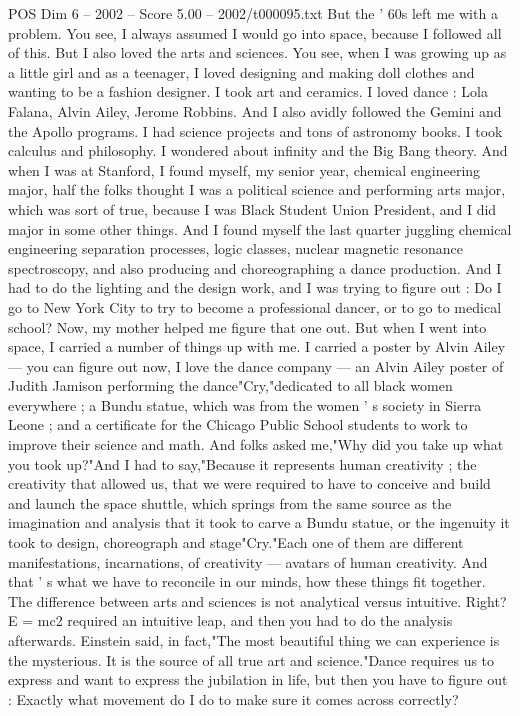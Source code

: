 \begin{textsample}{POS Dim 6 – 2002 – Score 5.00 – 2002/t000095.txt}
But the ' 60s left me with a problem.
You see, I always assumed I would go into space, because I followed all of this.
But I also loved the arts and sciences.
You see, when I was growing up as a little girl and as a teenager, I loved designing and making doll clothes and wanting to be a fashion designer.
I took art and ceramics.
I loved dance : Lola Falana, Alvin Ailey, Jerome Robbins.
And I also avidly followed the Gemini and the Apollo programs.
I had science projects and tons of astronomy books.
I took calculus and philosophy.
I wondered about infinity and the Big Bang theory.
And when I was at Stanford, I found myself, my senior year, chemical engineering major, half the folks thought I was a political science and performing arts major, which was sort of true, because I was Black Student Union President, and I did major in some other things.
And I found myself the last quarter juggling chemical engineering separation processes, logic classes, nuclear magnetic resonance spectroscopy, and also producing and choreographing a dance production.
And I had to do the lighting and the design work, and I was trying to figure out : Do I go to New York City to try to become a professional dancer, or to go to medical school?
Now, my mother helped me figure that one out.
But when I went into space, I carried a number of things up with me.
I carried a poster by Alvin Ailey — you can figure out now, I love the dance company — an Alvin Ailey poster of Judith Jamison performing the dance"Cry,"dedicated to all black women everywhere ; a Bundu statue, which was from the women ' s society in Sierra Leone ; and a certificate for the Chicago Public School students to work to improve their science and math.
And folks asked me,"Why did you take up what you took up?"And I had to say,"Because it represents human creativity ; the creativity that allowed us, that we were required to have to conceive and build and launch the space shuttle, which springs from the same source as the imagination and analysis that it took to carve a Bundu statue, or the ingenuity it took to design, choreograph and stage"Cry."Each one of them are different manifestations, incarnations, of creativity — avatars of human creativity.
And that ' s what we have to reconcile in our minds, how these things fit together.
The difference between arts and sciences is not analytical versus intuitive.
Right?
E = mc2 required an intuitive leap, and then you had to do the analysis afterwards.
Einstein said, in fact,"The most beautiful thing we can experience is the mysterious.
It is the source of all true art and science."Dance requires us to express and want to express the jubilation in life, but then you have to figure out : Exactly what movement do I do to make sure it comes across correctly?

\end{textsample}
